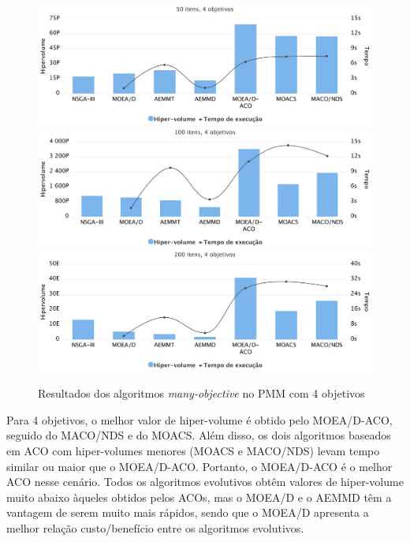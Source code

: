 \begin{figure}[!htbp]
	\includegraphics[width=1\textwidth]{cap_experimentos/figs/etapa4/i50o4}
	\includegraphics[width=1\textwidth]{cap_experimentos/figs/etapa4/i100o4}
	\includegraphics[width=1\textwidth]{cap_experimentos/figs/etapa4/i200o4}
	\caption{\label{fig_exp4_mkp_o4}Resultados dos algoritmos \textit{many-objective} no PMM com 4 objetivos}
\end{figure}

Para 4 objetivos, o melhor valor de hiper-volume é obtido pelo MOEA/D-ACO, seguido do MACO/NDS e do MOACS. Além disso, os dois algoritmos baseados em ACO com hiper-volumes menores (MOACS e MACO/NDS) levam tempo similar ou maior que o MOEA/D-ACO. Portanto, o MOEA/D-ACO é o melhor ACO nesse cenário. Todos os algoritmos evolutivos obtêm valores de hiper-volume muito abaixo àqueles obtidos pelos ACOs, mas o MOEA/D e o AEMMD têm a vantagem de serem muito mais rápidos, sendo que o MOEA/D apresenta a melhor relação custo/benefício entre os algoritmos evolutivos.

